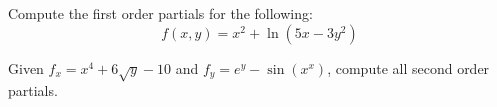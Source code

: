 \documentclass[addpoints]{exam}
\begin{document}
\begin{questions}
\question[20] Compute the first order partials for the following:
\[
	f(x,y) = x^2 + \ln (5x - 3y^2)
\]  

\question[40] Given $f_x = x^4 + 6 \sqrt{y} - 10$ and $f_y = e^y - \sin (x^x)$, compute all second order partials. 






\end{questions}
\end{document}
